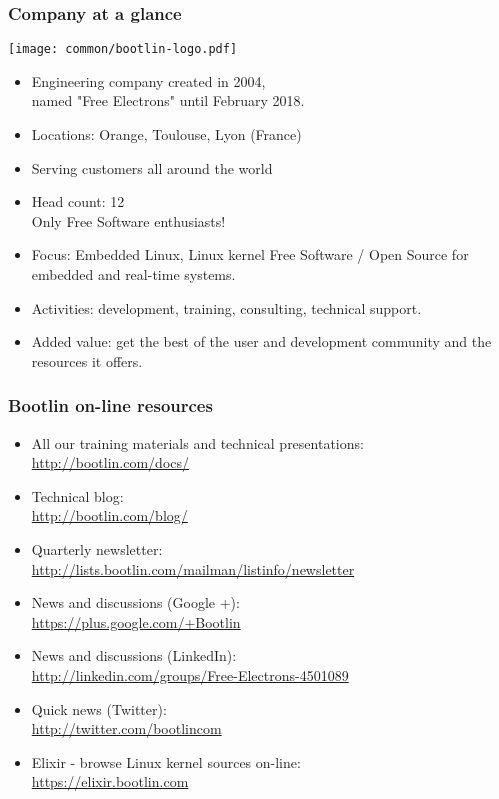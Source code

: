 \begin{frame}
\frametitle{Company at a glance}
  \texttt{[image: common/bootlin-logo.pdf]}
  \begin{itemize}
    \item Engineering company created in 2004,\\
          named "Free Electrons" until February 2018.
    \item Locations: Orange, Toulouse, Lyon (France)
    \item Serving customers all around the world
    \item Head count: 12 \\
	  Only Free Software enthusiasts!
    \item Focus: Embedded Linux, Linux kernel
          Free Software / Open Source
          for embedded and real-time systems.
    \item Activities: development, training, consulting, technical
          support.
    \item Added value: get the best of the user and development
          community and the resources it offers.
  \end{itemize}
\end{frame}

\begin{frame}
\frametitle{Bootlin on-line resources}
  \begin{itemize}
    \item All our training materials and technical presentations:\\
          \url{http://bootlin.com/docs/}
    \item Technical blog:\\
          \url{http://bootlin.com/blog/}
    \item Quarterly newsletter:\\
 	  \url{http://lists.bootlin.com/mailman/listinfo/newsletter}
    \item News and discussions (Google +):\\
	  \url{https://plus.google.com/+Bootlin}
    \item News and discussions (LinkedIn):\\
	  \url{http://linkedin.com/groups/Free-Electrons-4501089}
    \item Quick news (Twitter):\\
          \url{http://twitter.com/bootlincom}
    \item Elixir - browse Linux kernel sources on-line:\\
          \url{https://elixir.bootlin.com}
  \end{itemize}
\end{frame}

